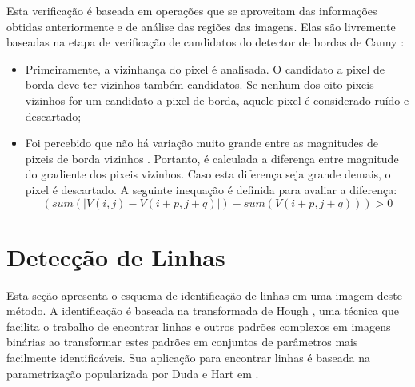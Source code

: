 Esta verificação é baseada em operações que se aproveitam das informações obtidas anteriormente e de análise das regiões das imagens. Elas são livremente baseadas na etapa de verificação de candidatos do detector de bordas de Canny \cite{canny}:


\begin{itemize}
\item Primeiramente, a vizinhança do pixel é analisada. O candidato a pixel de borda deve ter vizinhos também candidatos. Se nenhum dos oito pixeis vizinhos for um candidato a pixel de borda, aquele pixel é considerado ruído e descartado;
\item Foi percebido que não há variação muito grande entre as magnitudes de pixeis de borda vizinhos \cite{mrf}. Portanto, é calculada a diferença entre magnitude do gradiente dos pixeis vizinhos. Caso esta diferença seja grande demais, o pixel é descartado. A seguinte inequação é definida para avaliar a diferença:
\begin{equation}
(sum(| V(i,j) - V(i+p,j+q) |)- sum(V(i+p,j+q))) >0
\end{equation}


\end {itemize}

\section{Detecção de Linhas} \label{met:linha}




Esta seção apresenta o esquema de identificação de linhas em uma imagem deste método. A identificação é baseada na transformada de Hough \cite{houghintro00}, uma técnica que facilita o trabalho de encontrar linhas e outros padrões complexos em imagens binárias ao transformar estes padrões em conjuntos de parâmetros mais facilmente identificáveis. Sua aplicação para encontrar linhas é baseada na parametrização popularizada por Duda e Hart em \cite{houghintro02}.

